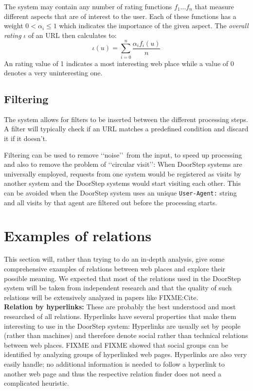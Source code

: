 \documentclass[a4paper]{danarticle}
\theoremstyle{remark}
\begin{document}
       The system may contain any number of rating functions $ f_1
       \dots f_n $ that measure different aspects that are of interest to
       the user.
       Each of these functions has a weight
       $ 0 < \alpha_i \leq 1 $ which indicates the importance of the given 
       aspect.
       The \textit{overall rating} $ \iota $ of an URL then calculates
       to:
       \[
         \iota(u) = \sum_{i = 0}^{n} 
	 \frac{\alpha_i f_i(u)}{n}
       \]
       An rating value of 1 indicates a most interesting web place
       while a
       value of 0 denotes a very uninteresting one. 
     \subsection{Filtering}
       The system allows for filters to be inserted between the different
       processing steps. A filter will typically check if an URL matches a
       predefined condition and discard it if it doesn't.
       
       Filtering can be used to remove \lq\lq noise\rq\rq\ from the input, to 
       speed up processing and also to remove the problem of 
       \lq\lq circular visit\rq\rq : When DoorStep systems are universally 
       employed, requests from one system would be registered as visits by 
       another system and the DoorStep systems would start visiting each other. 
       This can be avoided when the DoorStep system uses an unique 
       \verb$User-Agent:$ string and all visits by that agent are filtered out 
       before the processing starts.
  \section{Examples of relations}
    This section will, rather than trying to do an in-depth analysis, give some 
    comprehensive examples of relations between web places and explore their 
    possible meaning. We expected that most of the relations used in the 
    DoorStep system will be taken from independent research and that the quality 
    of such relations will be extensively analyzed in papers like FIXME:Cite.
    \\
    
    \textbf{Relation by hyperlinks:} These are probably the best understood and 
    most researched of all relations. Hyperlinks have several properties that 
    make them interesting to use in the DoorStep system: Hyperlinks are usually 
    set by people (rather than machines) and therefore denote social rather than 
    technical relations between web places. FIXME and FIXME showed that 
    social groups can be identified by analyzing groups of hyperlinked web 
    pages. Hyperlinks are also very easily handle; no additional information is 
    needed to follow a hyperlink to another web page and thus the respective 
    relation finder does not need a complicated heuristic.
    \\
    
\end{document}
